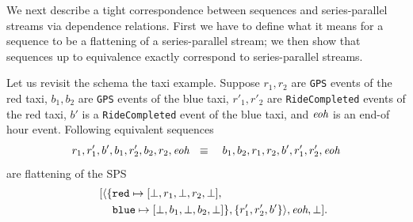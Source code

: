 We next describe a tight correspondence between sequences and series-parallel streams via dependence relations. First we have to define what it means for a sequence to be a flattening of a series-parallel stream; we then show that sequences up to equivalence exactly correspond to series-parallel streams.

\begin{example}
\label{45:ex:gps-flatten}
Let us revisit the schema the taxi example.
Suppose $r_1, r_2$ are \texttt{GPS} events of the red taxi,
$b_1, b_2$ are \texttt{GPS} events of the blue taxi,
$r'_1, r'_2$ are \texttt{RideCompleted} events of the red taxi,
$b'$ is a \texttt{RideCompleted} event of the blue taxi,
and $\textit{eoh}$ is an end-of hour event.
Following equivalent sequences
$$r_1, r'_1, b', b_1, r'_2, b_2, r_2, \textit{eoh}\ \ \equiv\ \ \
b_1, b_2, r_1, r_2, b', r'_1, r'_2, \textit{eoh}$$
are flattening of the SPS
\begin{align*}
~\qquad
[ \langle \{& {\texttt{red}}\mapsto{[\bot,r_1,\bot,r_2,\bot]}, \\
& {\texttt{blue}}\mapsto{[\bot,b_1,\bot,b_2,\bot]}\}, \{r'_1,r'_2,b'\} \rangle,
\textit{eoh}, \bot
]. \quad \end{align*}
\end{example}

